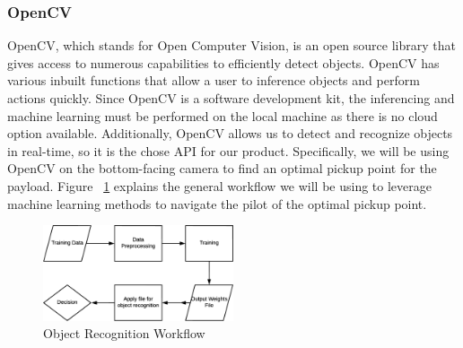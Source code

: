 \documentclass[onecolumn, oneside, letterpaper, draftclsnofoot, 10pt, compsoc]{IEEEtran}
\begin{document}
\subsubsection{OpenCV}
OpenCV, which stands for Open Computer Vision, is an open source library that gives access to numerous capabilities to efficiently detect objects. OpenCV has various inbuilt functions that allow a user to inference objects and perform actions quickly. Since OpenCV is a software development kit, the inferencing and machine learning must be performed on the local machine as there is no cloud option available. Additionally, OpenCV allows us to detect and recognize objects in real-time, so it is the chose API for our product. Specifically, we will be using OpenCV on the bottom-facing camera to find an optimal pickup point for the payload. Figure ~\ref{fig:ObjectRecognitionWorkflow} explains the general workflow we will be using to leverage machine learning methods to navigate the pilot of the optimal pickup point.

\begin{figure}[h!]
    \centering
    \includegraphics[width=0.5\textwidth]{graphics/object_recognition_workflow.eps}
    \caption{Object Recognition Workflow}
    \label{fig:ObjectRecognitionWorkflow}
\end{figure}
\end{document}
